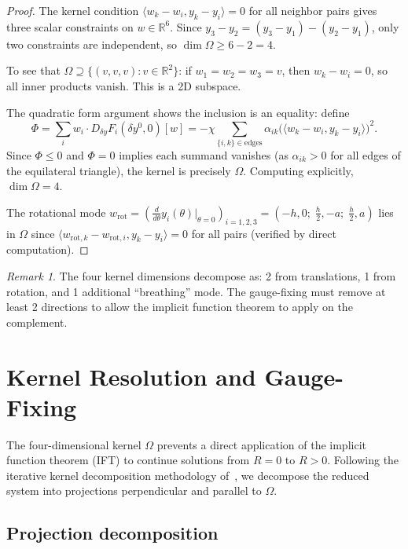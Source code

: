 \documentclass[11pt]{article}
\theoremstyle{plain}%
\theoremstyle{definition}%
\theoremstyle{definition}%
\theoremstyle{remark}%
\newtheorem{rmk}[thm]{Remark}%
\numberwithin{equation}{section}
\newcommand{\R}{\mathbb{R}}
\newcommand{\ip}[2]{\langle #1, #2 \rangle}
\begin{document}
\begin{proof}
The kernel condition $\ip{w_k-w_i}{y_k-y_i}=0$ for all neighbor pairs gives three scalar constraints on $w\in\R^6$. Since $y_3-y_2 = (y_3-y_1)-(y_2-y_1)$, only two constraints are independent, so $\dim\Omega\geq 6-2=4$.

To see that $\Omega\supseteq\{(v,v,v):v\in\R^2\}$: if $w_1=w_2=w_3=v$, then $w_k-w_i=0$, so all inner products vanish. This is a 2D subspace.

The quadratic form argument shows the inclusion is an equality: define
\[
\Phi = \sum_i w_i\cdot D_{\delta y}F_i(\delta y^0,0)[w] = -\chi\sum_{\{i,k\}\in\text{edges}}\alpha_{ik}\bigl(\ip{w_k-w_i}{y_k-y_i}\bigr)^2.
\]
Since $\Phi\leq 0$ and $\Phi=0$ implies each summand vanishes (as $\alpha_{ik}>0$ for all edges of the equilateral triangle), the kernel is precisely $\Omega$. Computing explicitly, $\dim\Omega=4$.

The rotational mode $w_{\mathrm{rot}}=(\frac{d}{d\theta}y_i(\theta)|_{\theta=0})_{i=1,2,3}=(-h,0;\;\frac{h}{2},-a;\;\frac{h}{2},a)$ lies in $\Omega$ since $\ip{w_{\mathrm{rot},k}-w_{\mathrm{rot},i}}{y_k-y_i}=0$ for all pairs (verified by direct computation).
\end{proof}

\begin{rmk}\label{rmk:kernel-dim}
The four kernel dimensions decompose as: 2 from translations, 1 from rotation, and 1 additional ``breathing'' mode. The gauge-fixing must remove at least 2 directions to allow the implicit function theorem to apply on the complement.
\end{rmk}


\section{Kernel Resolution and Gauge-Fixing}\label{sec:gauge}

The four-dimensional kernel $\Omega$ prevents a direct application of the implicit function theorem (IFT) to continue solutions from $R=0$ to $R>0$. Following the iterative kernel decomposition methodology of~\cite{KirrNatarajan2018}, we decompose the reduced system into projections perpendicular and parallel to $\Omega$.


\subsection{Projection decomposition}\label{subsec:projections}
\end{document}
